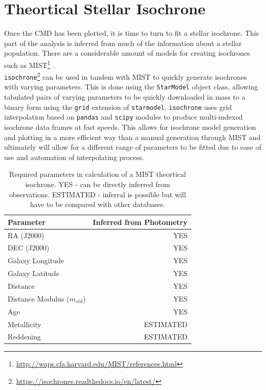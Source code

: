 \section{Theortical Stellar Isochrone} \label{sec: Isochrone}

Once the CMD has been plotted, it is time to turn to fit a stellar isochrone. This part of the analysis is inferred from much of the information about a stellar population. There are a considerable amount of models for creating isochrones such as MIST\footnote{\url{http://waps.cfa.harvard.edu/MIST/references.html}} \citep{choi, PAXTON}. \\  

\verb|isochrone|\footnote{\url{https://isochrones.readthedocs.io/en/latest/}} can be used in tandem with MIST to quickly generate isochrones with varying parameters. This is done using the \verb|StarModel| object class, allowing tabulated pairs of varying parameters to be quickly downloaded in mass to a binary form using the \verb|grid| extension of \verb|starmodel|. \verb|isochrone| uses grid interpolation based on \verb|pandas| and \verb|scipy| modules to produce multi-indexed isochrone data frames at fast speeds. This allows for isochrone model generation and plotting in a more efficient way than a manual generation through MIST and ultimately will allow for a different range of parameters to be fitted due to ease of use and automation of interpolating process. 

\begin{table}[h!]
    \begin{tabular}{l r}
        \hline \hline 
        Parameter & Inferred from Photometry \\ \hline 
        RA (J2000) & YES \\
        DEC (J2000) & YES \\ 
        Galaxy Longitude & YES \\ 
        Galaxy Latitude &  YES \\ 
        Distance & YES \\ 
        Distance Modulus ($m_{std}$) & YES \\ 
        Age & YES \\ 
        Metallicity & ESTIMATED \\ 
        Reddening & ESTIMATED \\ \hline 
    \end{tabular}
    \caption{Required parameters in calculation of a MIST theortical isochrone. YES - can be directly inferred from observations. ESTIMATED - inferral is possible but will have to be compared with other databases.}
    \label{tb: parameters}
\end{table}


